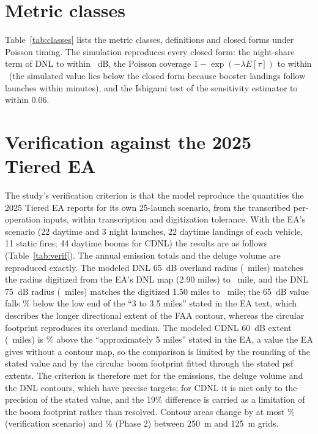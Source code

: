 \documentclass[11pt]{article}
\begin{document}
\section{Metric classes}
\label{sec:classes}

Table~\ref{tab:classes} lists the metric classes, definitions and closed forms under Poisson timing. The simulation reproduces every closed form: the night-share term of DNL to within \valEThreeNightCfMaxabsdiffDbOneDp~dB, the Poisson coverage $1 - \exp(-\lambda E[\tau])$ to within \valEOneCoverageCfMaxabsdiff~(the simulated value lies below the closed form because booster landings follow launches within minutes), and the Ishigami test of the sensitivity estimator to within 0.06.

\begin{table}[htbp]
\caption{Metric classes, definitions and Poisson closed forms.}
\label{tab:classes}
\centering\footnotesize
\tableMetricDefinitions
\end{table}

\section{Verification against the 2025 Tiered EA}
\label{sec:verif}

The study's verification criterion is that the model reproduce the quantities the 2025 Tiered EA reports for its own 25-launch scenario, from the transcribed per-operation inputs, within transcription and digitization tolerance. With the EA's scenario (22 daytime and 3 night launches, 22 daytime landings of each vehicle, 11 static fires; 44 daytime booms for CDNL) the results are as follows (Table~\ref{tab:verif}). The annual emission totals and the deluge volume are reproduced exactly. The modeled DNL 65~dB overland radius (\valVerifDnlSixFiveDbContourExtentMiles~miles) matches the radius digitized from the EA's DNL map (2.90 miles) to \valVerifDnlSixFiveVsDigitizedMiles~mile, and the DNL 75~dB radius (\valVerifDnlSevenFiveDbOverlandContourRadiusDigitizedFigureTwoOneMiles~miles) matches the digitized 1.50 miles to \valVerifDnlSevenFiveVsDigitizedMiles~mile; the 65~dB value falls \valVerifDnlSixFiveBelowLowEndPct\% below the low end of the ``3 to 3.5 miles'' stated in the EA text, which describes the longer directional extent of the FAA contour, whereas the circular footprint reproduces its overland median. The modeled CDNL 60~dB extent (\valVerifCdnlSixZeroDbContourExtentMiles~miles) is \valVerifCdnlSixZeroAboveStatedPct\% above the ``approximately 5 miles'' stated in the EA, a value the EA gives without a contour map, so the comparison is limited by the rounding of the stated value and by the circular boom footprint fitted through the stated psf extents. The criterion is therefore met for the emissions, the deluge volume and the DNL contours, which have precise targets; for CDNL it is met only to the precision of the stated value, and the 19\% difference is carried as a limitation of the boom footprint rather than resolved. Contour areas change by at most \valConvVerifMaxRelPct\% (verification scenario) and \valConvPhaseTwoMaxRelPct\% (Phase 2) between 250~m and 125~m grids.
\end{document}
